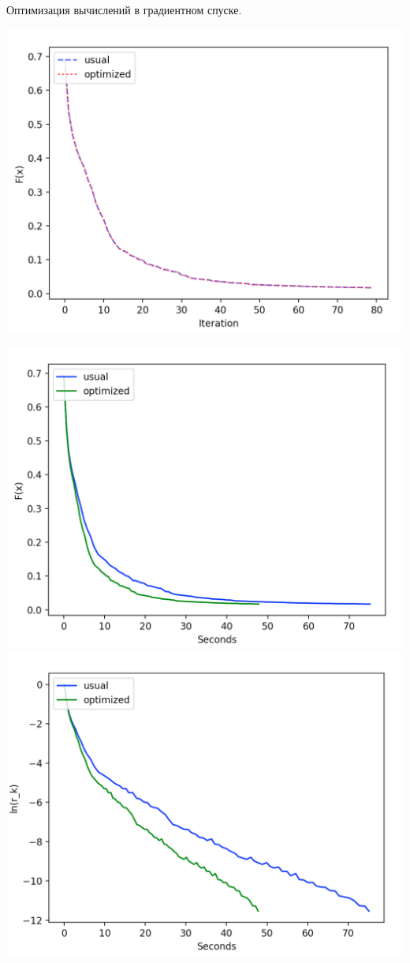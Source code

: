 \documentclass{article}
\theoremstyle{definition}
\theoremstyle{remark}
\begin{document}
Оптимизация вычислений в градиентном спуске.


\includegraphics[width=0.6 \textwidth]{41.png}


\includegraphics[width=0.6 \textwidth]{42.png}
\includegraphics[width=0.6 \textwidth]{43.png}
\end{document}
